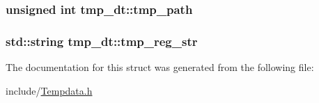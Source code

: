 \subsubsection[{tmp\+\_\+path}]{\setlength{\rightskip}{0pt plus 5cm}unsigned int tmp\+\_\+dt\+::tmp\+\_\+path\hspace{0.3cm}{\ttfamily [static]}}\label{structtmp__dt_a5133f5ea97efb23fde6f33ec7c8d454e}
\hypertarget{structtmp__dt_ae8a89114cd6dda550e3d1561f6fdc7a9}{}
\subsubsection[{tmp\+\_\+reg\+\_\+str}]{\setlength{\rightskip}{0pt plus 5cm}std\+::string tmp\+\_\+dt\+::tmp\+\_\+reg\+\_\+str\hspace{0.3cm}{\ttfamily [static]}}\label{structtmp__dt_ae8a89114cd6dda550e3d1561f6fdc7a9}


The documentation for this struct was generated from the following file\+:\begin{DoxyCompactItemize}
\item 
include/\hyperlink{_tempdata_8h}{Tempdata.\+h}\end{DoxyCompactItemize}
